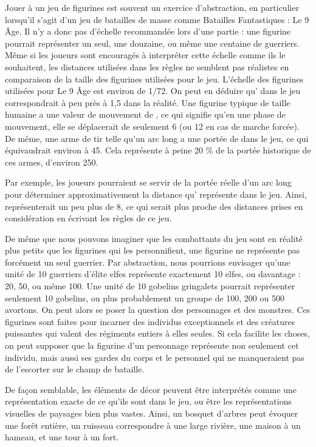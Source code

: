 Jouer à un jeu de figurines est souvent un exercice d'abstraction, en particulier lorsqu'il s'agit d'un jeu de batailles de masse comme Batailles Fantastiques : Le 9\ieme{} Âge. Il n'y a donc pas d'échelle recommandée lors d'une partie : une figurine pourrait représenter un seul, une douzaine, ou même une centaine de guerriers. Même si les joueurs sont encouragés à interpréter cette échelle comme ils le souhaitent, les distances utilisées dans les règles ne semblent pas réalistes en comparaison de la taille des figurines utilisées pour le jeu. L'échelle des figurines utilisées pour Le 9\ieme{} Âge est environ de 1/72. On peut en déduire qu' dans le jeu correspondrait à peu près à 1,5 {\meter} dans la réalité. Une figurine typique de taille humaine a une valeur de mouvement de , ce qui signifie qu'en une phase de mouvement, elle se déplacerait de seulement \unit{6}{\meter} (ou \unit{12}{\meter} en cas de marche forcée). De même, une arme de tir telle qu'un arc long a une portée de  dans le jeu, ce qui équivaudrait environ à \unit{45}{\meter}. Cela représente à peine 20 \% de la portée historique de ces armes, d'environ \unit{250}{\meter}.

Par exemple, les joueurs pourraient se servir de la portée réelle d'un arc long pour déterminer approximativement la distance qu' représente dans le jeu. Ainsi,  représenterait un peu plus de \unit{8}{\meter}, ce qui serait plus proche des distances prises en considération en écrivant les règles de ce jeu.

De même que nous pouvons imaginer que les combattants du jeu sont en réalité plus petits que les figurines qui les personnifient, une figurine ne représente pas forcément un seul guerrier. Par abstraction, nous pourrions envisager qu'une unité de 10 guerriers d'élite elfes représente exactement 10 elfes, ou davantage : 20, 50, ou même 100. Une unité de 10 gobelins gringalets pourrait représenter seulement 10 gobelins, ou plus probablement un groupe de 100, 200 ou 500 avortons. On peut alors se poser la question des personnages et des monstres. Ces figurines sont faites pour incarner des individus exceptionnels et des créatures puissantes qui valent des régiments entiers à elles seules. Si cela facilite les choses, on peut supposer que la figurine d'un personnage représente non seulement cet individu, mais aussi ses gardes du corps et le personnel qui ne manqueraient pas de l'escorter sur le champ de bataille.

De façon semblable, les éléments de décor peuvent être interprétés comme une représentation exacte de ce qu'ils sont dans le jeu, ou être les représentations visuelles de paysages bien plus vastes. Ainsi, un bosquet d'arbres peut évoquer une forêt entière, un ruisseau correspondre à une large rivière, une maison à un hameau, et une tour à un fort.

